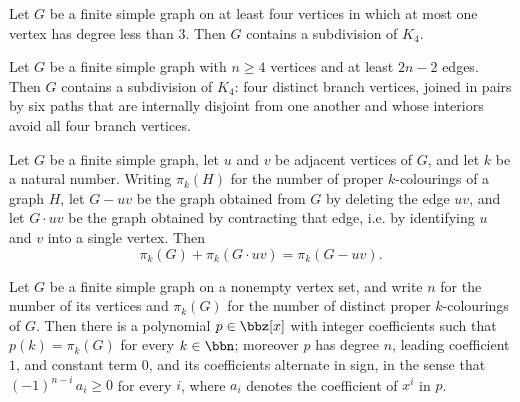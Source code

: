 \begin{theorem}
\label{SimpleGraph.hasK4Subdivision_of_few_low_degree}
\leanok
{}
Let $G$ be a finite simple graph on at least four vertices in which at most one vertex
has degree less than $3$. Then $G$ contains a subdivision of $K_4$.
\end{theorem}

\begin{theorem}
\label{SimpleGraph.hasK4Subdivision_of_card_edges}
\leanok
{}
Let $G$ be a finite simple graph with $n \ge 4$ vertices and at least $2n - 2$ edges.
Then $G$ contains a subdivision of $K_4$: four distinct branch vertices, joined in pairs
by six paths that are internally disjoint from one another and whose interiors avoid all
four branch vertices.
\end{theorem}

\begin{theorem}
\label{SimpleGraph.numColorings_add_contract}
\leanok
{}
Let $G$ be a finite simple graph, let $u$ and $v$ be adjacent vertices of $G$, and let
$k$ be a natural number. Writing $\pi_k(H)$ for the number of proper $k$-colourings of a
graph $H$, let $G - uv$ be the graph obtained from $G$ by deleting the edge $uv$, and
let $G \cdot uv$ be the graph obtained by contracting that edge, i.e. by identifying $u$
and $v$ into a single vertex. Then
\[
\pi_k(G) + \pi_k(G \cdot uv) = \pi_k(G - uv).
\]
\end{theorem}

\begin{theorem}
\label{SimpleGraph.exists_chromaticPolynomial}
\leanok
{}
Let $G$ be a finite simple graph on a nonempty vertex set, and write $n$ for the number
of its vertices and $\pi_k(G)$ for the number of distinct proper $k$-colourings of $G$.
Then there is a polynomial $p \in \bbz[x]$ with integer coefficients such that $p(k) =
\pi_k(G)$ for every $k \in \bbn$; moreover $p$ has degree $n$, leading coefficient $1$,
and constant term $0$, and its coefficients alternate in sign, in the sense that
$(-1)^{n-i}\,a_i \ge 0$ for every $i$, where $a_i$ denotes the coefficient of $x^i$ in
$p$.
\end{theorem}

